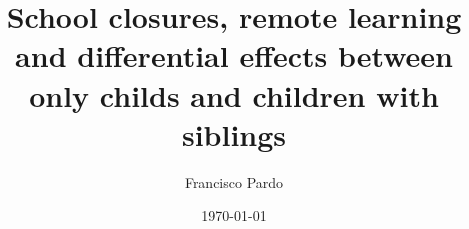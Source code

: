 
\title{School closures, remote learning and differential
effects between only childs and children with
siblings} %
\author{
	Francisco Pardo \\
}
\date{\today}
\JEL{}
\Keywords{}